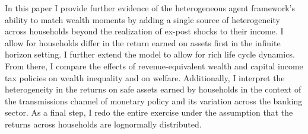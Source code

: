 \par In this paper I provide further evidence of the heterogeneous agent framework's ability to match wealth moments by adding a single source of heterogeneity across households beyond the realization of ex-post shocks to their income. I allow for households differ in the return earned on assets first in the infinite horizon setting. I further extend the model to allow for rich life cycle dynamics. From there, I compare the effects of revenue-equivalent wealth and capital income tax policies on wealth inequality and on welfare. Additionally, I interpret the heterogeneity in the returns on safe assets earned by households in the context of the transmissions channel of monetary policy and its variation across the banking sector. As a final step, I redo the entire exercise under the assumption that the returns across households are lognormally distributed.